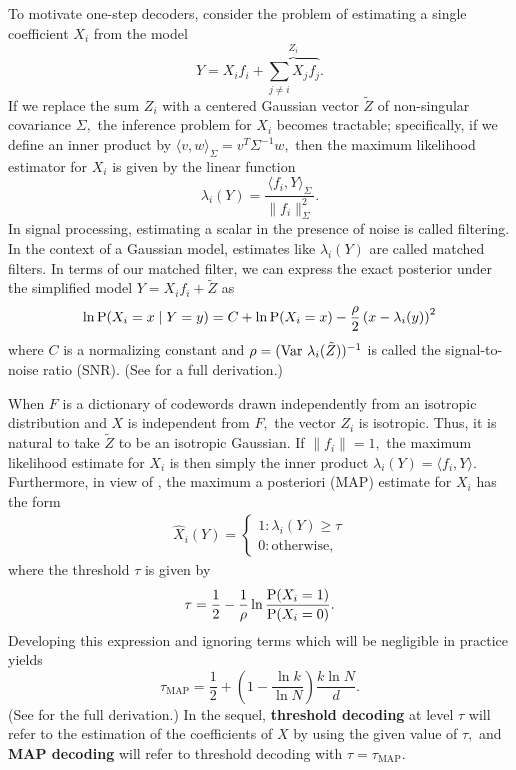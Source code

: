 To motivate one-step decoders, consider the problem of estimating a single coefficient $X_i$ from the model
\begin{equation}
	Y = X_i f_i + \overbrace{\sum_{j \neq i} X_j f_j}^{Z_i}.
\end{equation}
 If we replace the sum $Z_i$ with a centered Gaussian vector $\tilde Z$ of non-singular covariance $\Sigma,$ the inference problem for $X_i$ becomes tractable; specifically, if we define an inner product by $\langle v, w \rangle_\Sigma = v^T \Sigma^{-1} w,$ then the maximum likelihood estimator for $X_i$ is given by the linear function
$$
	\lambda_i(Y) = \frac{\langle f_i, Y \rangle_\Sigma}{\lVert f_i \rVert_\Sigma^2}.
$$
In signal processing, estimating a scalar in the presence of noise is called filtering. In the context of a Gaussian model, estimates like $\lambda_i(Y)$ are called matched filters. In terms of our matched filter, we can express the exact posterior under the simplified model $Y = X_i f_i + \tilde Z$ as
\begin{align} \label{eq:log_odds}
	 \ln \operatorname{P}(X_i = x \mid Y = y)  = C + \ln \operatorname{P}(X_i = x) -\frac {\rho} 2 \left(x - \lambda_i(y) \right)^2
\end{align}
where $C$ is a normalizing constant and $\rho = (\operatorname{Var} \, \lambda_i(\tilde Z))^{-1}$ is called the signal-to-noise ratio (SNR). (See  for a full derivation.)

When $F$ is a dictionary of codewords drawn independently from an isotropic distribution and $X$ is independent from $F,$ the vector $Z_i$ is isotropic. Thus, it is natural to take $\tilde Z$ to be an isotropic Gaussian. If $\lVert f_i \rVert = 1,$ the maximum likelihood estimate for $X_i$ is then simply the inner product $\lambda_i(Y) = \langle f_i, Y \rangle.$  Furthermore, in view of , the maximum a posteriori (MAP) estimate for $X_i$ has the form
\begin{align}
\hat X_i(Y) = \begin{cases}
1 \colon \lambda_i(Y) \ge \tau \\ 0 \colon \text{otherwise},
\end{cases} \label{eq:threshold}
\end{align}
where the threshold $\tau$ is given by
$$
\tau = \frac 1 2 - \frac 1{\rho} \ln \frac{\operatorname{P}(X_i = 1)}{\operatorname{P}(X_i = 0)}.
$$
Developing this expression and ignoring terms which will be negligible in practice yields
$$
\tau_\text{MAP} = \frac 1 2 + \left(1 - \frac{\ln k}{\ln N} \right) \frac{k \ln N}{d}.
$$
(See  for the full derivation.) In the sequel, \textbf{threshold decoding} at level $\tau$ will refer to the estimation of the coefficients of $X$ by  using the given value of $\tau,$ and \textbf{MAP decoding} will refer to threshold decoding with $\tau = \tau_\text{MAP}.$

